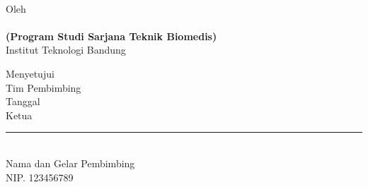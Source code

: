 \clearpage
\pagestyle{empty}

\begin{center}
	\renewcommand{\baselinestretch}{1}
    \large{\bfseries \MakeUppercase{\thetitle}}
    \\[2\baselineskip]
	
    \normalsize{Oleh\\
    \textbf{\theauthor}\\
    \textbf{(Program Studi Sarjana Teknik Biomedis)}
    \\[\baselineskip]
    Institut Teknologi Bandung}
    \\[3\baselineskip]

    \normalsize{Menyetujui\\
    Tim Pembimbing
    \\[\baselineskip]
    
    Tanggal \thedate\\[2\baselineskip]
    Ketua\\[4\baselineskip]
    \rule{5cm}{0.4pt} \\
    Nama dan Gelar Pembimbing\\
    NIP. 123456789}

\end{center}
\clearpage
